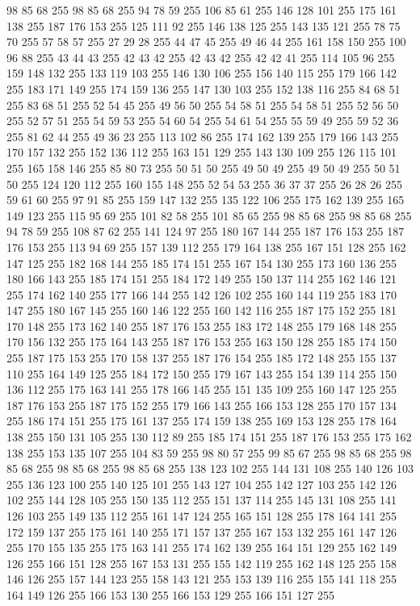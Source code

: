 98 85 68 255 98 85 68 255 94 78 59 255 106 85 61 255 146 128 101 255 175 161 138 255 187 176 153 255 125 111 92 255 146 138 125 255 143 135 121 255 78 75 70 255 57 58 57 255 27 29 28 255 44 47 45 255 49 46 44 255 161 158 150 255 100 96 88 255 43 44 43 255 42 43 42 255 42 43 42 255 42 42 41 255 114 105 96 255 159 148 132 255 133 119 103 255 146 130 106 255 156 140 115 255 179 166 142 255 183 171 149 255 174 159 136 255 147 130 103 255 152 138 116 255 84 68 51 255 83 68 51 255 52 54 45 255 49 56 50 255 54 58 51 255 54 58 51 255 52 56 50 255 52 57 51 255 54 59 53 255 54 60 54 255 54 61 54 255 55 59 49 255 59 52 36 255 81 62 44 255 49 36 23 255 113 102 86 255 174 162 139 255 179 166 143 255 170 157 132 255 152 136 112 255 163 151 129 255 143 130 109 255 126 115 101 255 165 158 146 255 85 80 73 255 50 51 50 255 49 50 49 255 49 50 49 255 50 51 50 255 124 120 112 255 160 155 148 255 52 54 53 255 36 37 37 255
26 28 26 255 59 61 60 255 97 91 85 255 159 147 132 255 135 122 106 255 175 162 139 255 165 149 123 255 115 95 69 255 101 82 58 255 101 85 65 255 98 85 68 255 98 85 68 255 94 78 59 255 108 87 62 255 141 124 97 255 180 167 144 255 187 176 153 255 187 176 153 255 113 94 69 255 157 139 112 255 179 164 138 255 167 151 128 255 162 147 125 255 182 168 144 255 185 174 151 255 167 154 130 255 173 160 136 255 180 166 143 255 185 174 151 255 184 172 149 255 150 137 114 255 162 146 121 255 174 162 140 255 177 166 144 255 142 126 102 255 160 144 119 255 183 170 147 255 180 167 145 255 160 146 122 255 160 142 116 255 187 175 152 255 181 170 148 255 173 162 140 255 187 176 153 255 183 172 148 255 179 168 148 255 170 156 132 255 175 164 143 255 187 176 153 255 163 150 128 255 185 174 150 255 187 175 153 255 170 158 137 255 187 176 154 255 185 172 148 255 155 137 110 255 164 149 125 255 184 172 150 255 179 167 143 255 154 139 114 255 150 136 112 255 175 163 141 255 178 166 145 255 151 135 109 255
160 147 125 255 187 176 153 255 187 175 152 255 179 166 143 255 166 153 128 255 170 157 134 255 186 174 151 255 175 161 137 255 174 159 138 255 169 153 128 255 178 164 138 255 150 131 105 255 130 112 89 255 185 174 151 255 187 176 153 255 175 162 138 255 153 135 107 255 104 83 59 255 98 80 57 255 99 85 67 255 98 85 68 255 98 85 68 255 98 85 68 255 98 85 68 255 138 123 102 255 144 131 108 255 140 126 103 255 136 123 100 255 140 125 101 255 143 127 104 255 142 127 103 255 142 126 102 255 144 128 105 255 150 135 112 255 151 137 114 255 145 131 108 255 141 126 103 255 149 135 112 255 161 147 124 255 165 151 128 255 178 164 141 255 172 159 137 255 175 161 140 255 171 157 137 255 167 153 132 255 161 147 126 255 170 155 135 255 175 163 141 255 174 162 139 255 164 151 129 255 162 149 126 255 166 151 128 255 167 153 131 255 155 142 119 255 162 148 125 255 158 146 126 255 157 144 123 255 158 143 121 255 153 139 116 255 155 141 118 255 164 149 126 255 166 153 130 255 166 153 129 255 166 151 127 255
